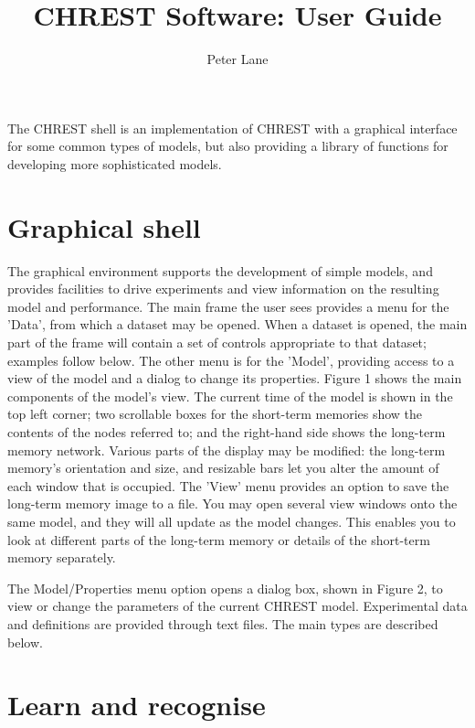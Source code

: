 \documentclass{article}
\title{CHREST Software: User Guide}
\author{Peter Lane}
\begin{document}
\maketitle

The CHREST shell is an implementation of CHREST with a graphical interface for some common types of models, but also providing a library of functions for developing more sophisticated models.

\section{Graphical shell}

The graphical environment supports the development of simple models, and provides facilities to drive experiments and view information on the resulting model and performance.  The main frame the user sees provides a menu for the 'Data', from which a dataset may be opened.  When a dataset is opened, the main part of the frame will contain a set of controls appropriate to that dataset; examples follow below.  The other menu is for the 'Model', providing access to a view of the model and a dialog to change its properties.  
Figure 1 shows the main components of the model's view.  The current time of the model is shown in the top left corner; two scrollable boxes for the short-term memories show the contents of the nodes referred to; and the right-hand side shows the long-term memory network.  Various parts of the display may be modified: the long-term memory's orientation and size, and resizable bars let you alter the amount of each window that is occupied.  The 'View' menu provides an option to save the long-term memory image to a file.  You may open several view windows onto the same model, and they will all update as the model changes.  This enables you to look at different parts of the long-term memory or details of the short-term memory separately.

The Model/Properties menu option opens a dialog box, shown in Figure 2, to view or change the parameters of the current CHREST model.  
Experimental data and definitions are provided through text files.  The main types are described below.

\section{Learn and recognise}
\end{document}
